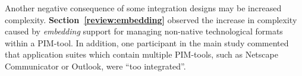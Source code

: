 Another negative consequence of some integration designs may be increased complexity.  \textbf{Section~\ref{review:embedding}} observed the increase in complexity caused by \textit{embedding} support for managing non-native technological formats within a PIM-tool.  In addition, one participant in the main study commented that application suites which contain multiple PIM-tools, such as Netscape Communicator or Outlook, were ``too integrated''. %

